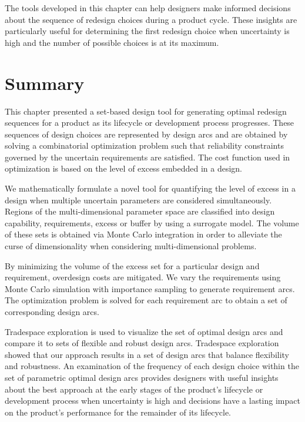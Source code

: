 The tools developed in this chapter can help designers make informed decisions about the sequence of redesign choices during a product cycle. These insights are particularly useful for determining the first redesign choice when uncertainty is high and the number of possible choices is at its maximum.

\section{Summary}
\label{sec:TSEcontsummary}

This chapter presented a set-based design tool for generating optimal redesign sequences for a product as its lifecycle or development process progresses. These sequences of design choices are represented by design arcs and are obtained by solving a combinatorial optimization problem such that reliability constraints governed by the uncertain requirements are satisfied. The cost function used in optimization is based on the level of excess embedded in a design. 

We mathematically formulate a novel tool for quantifying the level of excess in a design when multiple uncertain parameters are considered simultaneously. Regions of the multi-dimensional parameter space are classified into design capability, requirements, excess or buffer by using a surrogate model. The volume of these sets is obtained via Monte Carlo integration in order to alleviate the curse of dimensionality when considering multi-dimensional problems.

By minimizing the volume of the excess set for a particular design and requirement, overdesign costs are mitigated. We vary the requirements using Monte Carlo simulation with importance sampling to generate requirement arcs. The optimization problem is solved for each requirement arc to obtain a set of corresponding design arcs. 

Tradespace exploration is used to visualize the set of optimal design arcs and compare it to sets of flexible and robust design arcs. Tradespace exploration showed that our approach results in a set of design arcs that balance flexibility and robustness. An examination of the frequency of each design choice within the set of parametric optimal design arcs provides designers with useful insights about the best approach at the early stages of the product's lifecycle or development process when uncertainty is high and decisions have a lasting impact on the product's performance for the remainder of its lifecycle.

